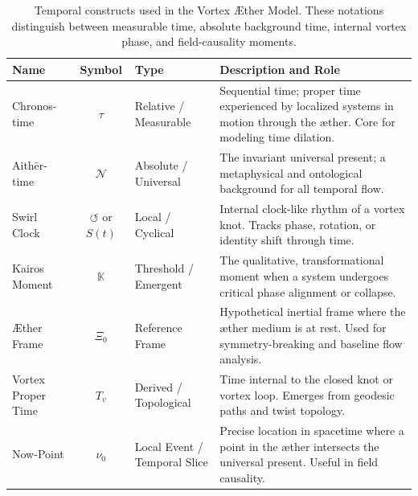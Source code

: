 \documentclass[a4paper,12pt]{article}
\begin{document}
    \begin{table}[h]
        \centering
        \begin{tabular}{|l|c|l|p{7cm}|}
            \hline
            \textbf{Name} & \textbf{Symbol} & \textbf{Type} & \textbf{Description and Role} \\
            \hline
            Chronos-time & $\tau$ & Relative / Measurable & Sequential time; proper time experienced by localized systems in motion through the æther. Core for modeling time dilation. \\
            \hline
            Aithēr-time & $\mathcal{N}$ & Absolute / Universal & The invariant universal present; a metaphysical and ontological background for all temporal flow. \\
            \hline
            Swirl Clock & $\circlearrowleft$ or $S(t)$ & Local / Cyclical & Internal clock-like rhythm of a vortex knot. Tracks phase, rotation, or identity shift through time. \\
            \hline
            Kairos Moment & $\mathbb{K}$ & Threshold / Emergent & The qualitative, transformational moment when a system undergoes critical phase alignment or collapse. \\
            \hline
            Æther Frame & $\Xi_0$ & Reference Frame & Hypothetical inertial frame where the æther medium is at rest. Used for symmetry-breaking and baseline flow analysis. \\
            \hline
            Vortex Proper Time & $T_v$ & Derived / Topological & Time internal to the closed knot or vortex loop. Emerges from geodesic paths and twist topology. \\
            \hline
            Now-Point & $\nu_0$ & Local Event / Temporal Slice & Precise location in spacetime where a point in the æther intersects the universal present. Useful in field causality. \\
            \hline
        \end{tabular}
        \caption{Temporal constructs used in the Vortex Æther Model. These notations distinguish between measurable time, absolute background time, internal vortex phase, and field-causality moments.}
        \label{tab:VAM_time}
    \end{table}
\end{document}
